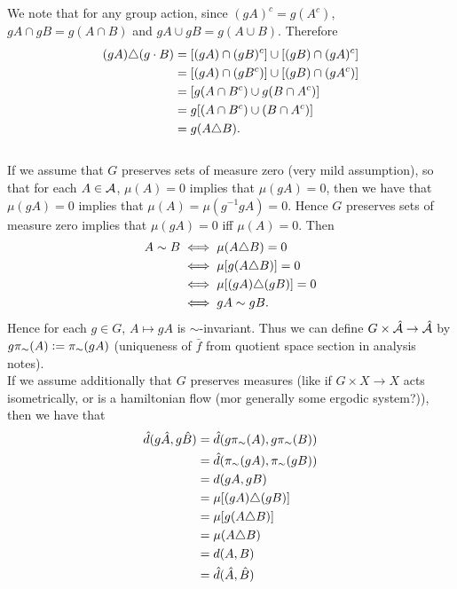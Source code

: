 \documentclass{book}
\begin{document}
\begin{itemize}
		We note that for any group action, since $(gA)^c = g(A^c)$, $gA \cap gB = g(A \cap B)$ and $gA \cup gB = g(A \cup B)$. Therefore 
		\begin{align*}
			(gA) \triangle (g \cdot B)
			& = [(gA) \cap (gB)^c] \cup  [(gB) \cap (gA)^c] \\
			& = [(gA) \cap (gB^c)] \cup  [(gB) \cap (gA^c)] \\
			& = [g(A \cap B^c) \cup g(B \cap A^c)] \\
			& = g[(A \cap B^c) \cup (B \cap A^c)] \\
			& = g (A\triangle B). 
		\end{align*}
		\\
		
		If we assume that $G$ preserves sets of measure zero (very mild assumption), so that for each $A \in \mathcal{A}$, $\mu(A) = 0$ implies that $\mu(gA) = 0$, then we have that $\mu(gA) = 0$ implies that $\mu(A) = \mu(g^{-1} g A) = 0$. Hence $G$ preserves sets of measure zero implies that $\mu(gA) = 0$ iff $\mu(A) = 0$. Then
		\begin{align*}
			A \sim B
			& \iff \mu(A \triangle B) = 0  \\
			& \iff \mu[g(A \triangle B)] = 0 \\
			& \iff \mu[(gA) \triangle (gB)] = 0 \\
			& \iff gA \sim gB. 
		\end{align*}
		Hence for each $g \in G$, $A \mapsto gA$ is $\sim$-invariant. Thus we can define $G \times \hat{\mathcal{A}} \rightarrow \hat{\mathcal{A}}$ by $g \pi_{\sim}(A) \vcentcolon= \pi_{\sim}(gA)$ (uniqueness of $\bar{f}$ from quotient space section in analysis notes). \\
		
		If we assume additionally that $G$ preserves measures (like if $G \times X \rightarrow X$ acts isometrically, or is a hamiltonian flow (mor generally some ergodic system?)), then we have that
		\begin{align*}
			\hat{d}(g \hat{A}, g\hat{B})
			& = \hat{d}(g \pi_{\sim}(A), g\pi_{\sim}(B)) \\
			& = \hat{d}(\pi_{\sim}(gA), \pi_{\sim}(gB)) \\
			& = d(gA, gB) \\
			& = \mu[(gA) \triangle (gB) ]\\
			& = \mu[g(A \triangle B)] \\
			& = \mu(A \triangle B) \\
			& = d(A, B) \\
			& = \hat{d}(\hat{A}, \hat{B})
		\end{align*}
		\\
		

\end{itemize}
\end{document}
